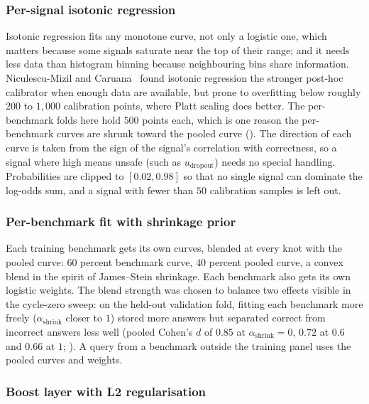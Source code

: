 \subsubsection{Per-signal isotonic regression}
\label{sec:composite-isotonic}

Isotonic regression fits any monotone curve, not only a logistic one, which matters because some signals saturate near the top of their range; and it needs less data than histogram binning because neighbouring bins share information. Niculescu-Mizil and Caruana~\cite{niculescu2005predicting} found isotonic regression the stronger post-hoc calibrator when enough data are available, but prone to overfitting below roughly $200$ to $1{,}000$ calibration points, where Platt scaling does better. The per-benchmark folds here hold $500$ points each, which is one reason the per-benchmark curves are shrunk toward the pooled curve (). The direction of each curve is taken from the sign of the signal's correlation with correctness, so a signal where high means unsafe (such as $u_{\text{dropout}}$) needs no special handling. Probabilities are clipped to $[0.02, 0.98]$ so that no single signal can dominate the log-odds sum, and a signal with fewer than $50$ calibration samples is left out.

\subsubsection{Per-benchmark fit with shrinkage prior}
\label{sec:composite-shrinkage}

Each training benchmark gets its own curves, blended at every knot with the pooled curve: $60$ percent benchmark curve, $40$ percent pooled curve, a convex blend in the spirit of James--Stein shrinkage. Each benchmark also gets its own logistic weights. The blend strength was chosen to balance two effects visible in the cycle-zero sweep: on the held-out validation fold, fitting each benchmark more freely ($\alpha_{\text{shrink}}$ closer to $1$) stored more answers but separated correct from incorrect answers less well (pooled Cohen's $d$ of $0.85$ at $\alpha_{\text{shrink}} = 0$, $0.72$ at $0.6$ and $0.66$ at $1$; ). A query from a benchmark outside the training panel uses the pooled curves and weights.

\subsubsection{Boost layer with L2 regularisation}
\label{sec:composite-boost}

